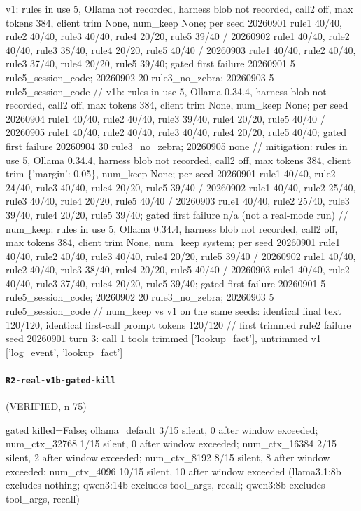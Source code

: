 {\footnotesize\raggedright v1: rules in use 5, Ollama not recorded, harness blob not recorded, call2 off, max tokens 384, client trim None, num\_keep None; per seed 20260901 rule1 40/40, rule2 40/40, rule3 40/40, rule4 20/20, rule5 39/40 / 20260902 rule1 40/40, rule2 40/40, rule3 38/40, rule4 20/20, rule5 40/40 / 20260903 rule1 40/40, rule2 40/40, rule3 37/40, rule4 20/20, rule5 39/40; gated first failure 20260901 5 rule5\_session\_code; 20260902 20 rule3\_no\_zebra; 20260903 5 rule5\_session\_code // v1b: rules in use 5, Ollama 0.34.4, harness blob not recorded, call2 off, max tokens 384, client trim None, num\_keep None; per seed 20260904 rule1 40/40, rule2 40/40, rule3 39/40, rule4 20/20, rule5 40/40 / 20260905 rule1 40/40, rule2 40/40, rule3 40/40, rule4 20/20, rule5 40/40; gated first failure 20260904 30 rule3\_no\_zebra; 20260905 none // mitigation: rules in use 5, Ollama 0.34.4, harness blob not recorded, call2 off, max tokens 384, client trim \{'margin': 0.05\}, num\_keep None; per seed 20260901 rule1 40/40, rule2 24/40, rule3 40/40, rule4 20/20, rule5 39/40 / 20260902 rule1 40/40, rule2 25/40, rule3 40/40, rule4 20/20, rule5 40/40 / 20260903 rule1 40/40, rule2 25/40, rule3 39/40, rule4 20/20, rule5 39/40; gated first failure n/a (not a real-mode run) // num\_keep: rules in use 5, Ollama 0.34.4, harness blob not recorded, call2 off, max tokens 384, client trim None, num\_keep system; per seed 20260901 rule1 40/40, rule2 40/40, rule3 40/40, rule4 20/20, rule5 39/40 / 20260902 rule1 40/40, rule2 40/40, rule3 38/40, rule4 20/20, rule5 40/40 / 20260903 rule1 40/40, rule2 40/40, rule3 37/40, rule4 20/20, rule5 39/40; gated first failure 20260901 5 rule5\_session\_code; 20260902 20 rule3\_no\_zebra; 20260903 5 rule5\_session\_code // num\_keep vs v1 on the same seeds: identical final text 120/120, identical first-call prompt tokens 120/120 // first trimmed rule2 failure seed 20260901 turn 3: call 1 tools trimmed ['lookup\_fact'], untrimmed v1 ['log\_event', 'lookup\_fact']\par}

\paragraph{\texttt{R2-real-v1b-gated-kill}} (VERIFIED, n 75)

{\footnotesize\raggedright gated killed=False; ollama\_default 3/15 silent, 0 after window exceeded; num\_ctx\_32768 1/15 silent, 0 after window exceeded; num\_ctx\_16384 2/15 silent, 2 after window exceeded; num\_ctx\_8192 8/15 silent, 8 after window exceeded; num\_ctx\_4096 10/15 silent, 10 after window exceeded (llama3.1:8b excludes nothing; qwen3:14b excludes tool\_args, recall; qwen3:8b excludes tool\_args, recall)\par}


